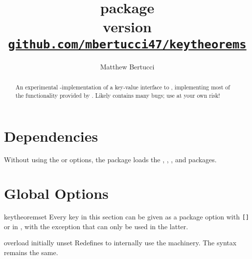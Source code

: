 \documentclass{ltxdoc}
\title{%
  \pkg{keytheorems} package \\[1ex]
  \large version \version \\[1ex]
  \href{https://github.com/mbertucci47/keytheorems}
    {\texttt{github.com/mbertucci47/keytheorems}}
  }
\author{Matthew Bertucci}
\newcommand{\bracks}[1]{\texttt{[#1]}}
\newcommand{\ttbraces}[1]{\braces{\texttt{#1}}}
\begin{document}
\maketitle

\begin{abstract}
An experimental -implementation of a key-value interface to , implementing most of the functionality provided by . Likely contains many bugs; use at your own risk!
\end{abstract}

\tableofcontents

\section{Dependencies}

Without using the  or  options, the package loads the , , , and  packages.
    
\section{Global Options}

\begin{docCommand}{keytheoremset}
  {}
Every key in this section can be given as a package option with \bracks{}\ttbraces{keytheorems} or in , with the exception that  can only be used in the latter.
\end{docCommand}

\begin{docKey}{overload}
  {}
  {initially unset}
Redefines  to internally use the  machinery. The syntax remains the same.
\end{docKey}
\end{document}
